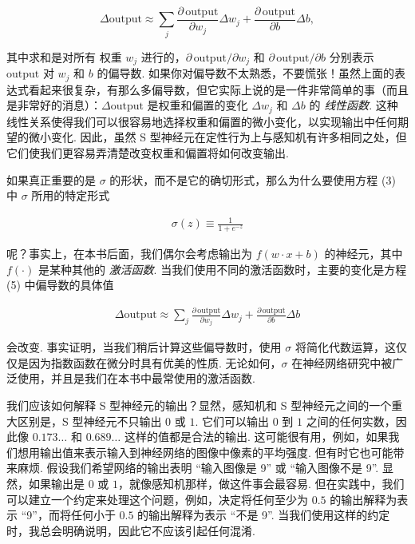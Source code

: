 \begin{equation}
\Delta \mbox{output} \approx \sum_j \frac{\partial \, \mbox{output}}{\partial w_j} \Delta w_j + \frac{\partial \, \mbox{output}}{\partial b} \Delta b,
\tag{5}
\end{equation}

\noindent 其中求和是对所有
权重 $w_j$ 进行的，$\partial \, \mbox{output} / \partial w_j$ 和 $\partial \, \mbox{output} /\partial b$ 分别表示 $\mbox{output}$ 对 $w_j$ 和 $b$ 的偏导数\label{term:21}\label{term:20}. 如果你对偏导数不太熟悉，不要慌张！虽然上面的表达式看起来很复杂，有那么多偏导数，但它实际上说的是一件非常简单的事（而且是非常好的消息）：$\Delta \mbox{output}$ 是权重和偏置的变化 $\Delta w_j$ 和 $\Delta b$ 的 \emph{线性函数}. 这种线性关系使得我们可以很容易地选择权重和偏置的微小变化，以实现输出中任何期望的微小变化. 因此，虽然 S 型神经元在定性行为上与感知机有许多相同之处，但它们使我们更容易弄清楚改变权重和偏置将如何改变输出.

如果真正重要的是 $\sigma$ 的形状，而不是它的确切形式，那么为什么要使用方程 (3) 中 $\sigma$ 所用的特定形式

\begin{align*}
\sigma(z) \equiv \frac{1}{1+e^{-z}} \nonumber
\end{align*}

\noindent 呢？事实上，在本书后面，我们偶尔会考虑输出为 $f(w \cdot x + b)$ 的神经元，其中 $f(\cdot)$ 是某种其他的 \emph{激活函数}. 当我们使用不同的激活函数时，主要的变化是方程 (5) 中偏导数的具体值

\begin{align*}
\Delta \mbox{output} \approx \sum_j \frac{\partial \, \mbox{output}}{\partial w_j} \Delta w_j + \frac{\partial \, \mbox{output}}{\partial b} \Delta b \nonumber
\end{align*}

\noindent 会改变. 事实证明，当我们稍后计算这些偏导数时，使用 $\sigma$ 将简化代数运算，这仅仅是因为指数函数在微分时具有优美的性质. 无论如何，$\sigma$ 在神经网络研究中被广泛使用，并且是我们在本书中最常使用的激活函数\label{term:22}.

我们应该如何解释 S 型神经元的输出？显然，感知机和 S 型神经元之间的一个重大区别是，S 型神经元不只输出 $0$ 或 $1$. 它们可以输出 $0$ 到 $1$ 之间的任何实数，因此像 $0.173\ldots$ 和 $0.689\ldots$ 这样的值都是合法的输出. 这可能很有用，例如，如果我们想用输出值来表示输入到神经网络的图像中像素的平均强度. 但有时它也可能带来麻烦. 假设我们希望网络的输出表明 ``输入图像是 9'' 或 ``输入图像不是 9''. 显然，如果输出是 $0$ 或 $1$，就像感知机那样，做这件事会最容易. 但在实践中，我们可以建立一个约定来处理这个问题，例如，决定将任何至少为 $0.5$ 的输出解释为表示 ``9''，而将任何小于 $0.5$ 的输出解释为表示 ``不是 9''. 当我们使用这样的约定时，我总会明确说明，因此它不应该引起任何混淆.

